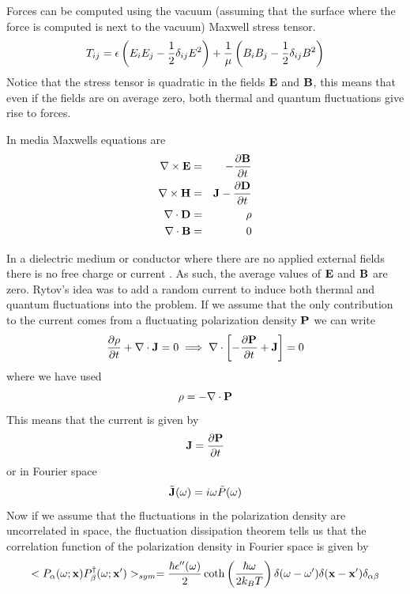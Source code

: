 Forces can be computed using the vacuum (assuming that the surface where the force is computed is next to the vacuum) Maxwell stress tensor.
\begin{equation}
T_{ij}= \epsilon\left(E_iE_j -{1\over 2}\delta_{ij}E^2\right) + {1\over \mu}\left( B_i B_j -{1\over 2}\delta_{ij}B^2\right)
\end{equation}
Notice that the stress tensor is quadratic in the fields ${\bf E}$ and ${\bf B}$, this means that even if the fields are on average zero, both thermal and quantum fluctuations give rise to forces.

In media Maxwells equations are
\begin{eqnarray}
\nabla \times{\bf E} &=& -{\partial {\bf B}\over \partial t} \\
\nabla \times{\bf H} &=& {\bf J}-{\partial {\bf D}\over \partial t} \\
\nabla \cdot {\bf D} &=& \rho\\
\nabla \cdot {\bf B} &=& 0 
\end{eqnarray}

In a dielectric medium or conductor where there are no applied external fields there is no free charge or current . As such, the average values of ${\bf E}$ and ${\bf B}$ are zero. Rytov's idea was to add a random current to induce both thermal and quantum fluctuations
into the problem. If we assume that the only contribution to the current comes from a fluctuating polarization density ${\bf P}$ we can write
\begin{equation}
{\partial \rho\over \partial t} +\nabla \cdot {\bf J}= 0\implies\nabla\cdot \left[-{\partial {\bf P}\over \partial t} +{\bf J}\right] = 0
\end{equation}
where we have used
\begin{equation}
\rho = -\nabla \cdot {\bf P}
\end{equation}
This means that the current is given by
\begin{equation}
{\bf J}={\partial {\bf P}\over \partial t} 
\end{equation}
or in Fourier space
\begin{equation}
\tilde {\bf J}(\omega)= i\omega \tilde P(\omega)
\end{equation}
Now if we assume that the fluctuations in the polarization density are uncorrelated in space, the fluctuation dissipation theorem tells us that the correlation function of the polarization density in Fourier space is given by
\begin{equation}
< P_\alpha(\omega; {\bf x})P^{\dagger}_\beta(\omega; {\bf x}')>_{sym}=
{\hbar \epsilon''(\omega)\over 2}\coth\left({\hbar\omega\over 2k_B T}\right)\delta(\omega-\omega')\delta({\bf x}-{\bf x}')\delta_{\alpha\beta}
\end{equation}

